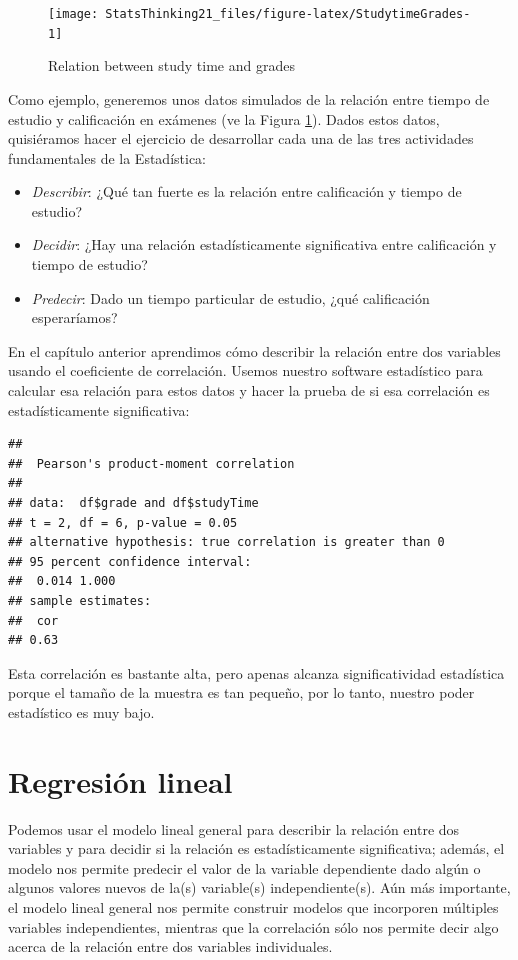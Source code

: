 \documentclass[
  12pt,
]{book}
\providecommand{\tightlist}{%
  \setlength{\itemsep}{0pt}\setlength{\parskip}{0pt}}
\begin{document}
\begin{figure}
\texttt{[image: StatsThinking21\_files/figure-latex/StudytimeGrades-1]} \caption{Relation between study time and grades}\label{fig:StudytimeGrades}
\end{figure}

Como ejemplo, generemos unos datos simulados de la relación entre tiempo de estudio y calificación en exámenes (ve la Figura \ref{fig:StudytimeGrades}). Dados estos datos, quisiéramos hacer el ejercicio de desarrollar cada una de las tres actividades fundamentales de la Estadística:

\begin{itemize}
\tightlist
\item
  \emph{Describir}: ¿Qué tan fuerte es la relación entre calificación y tiempo de estudio?
\item
  \emph{Decidir}: ¿Hay una relación estadísticamente significativa entre calificación y tiempo de estudio?
\item
  \emph{Predecir}: Dado un tiempo particular de estudio, ¿qué calificación esperaríamos?
\end{itemize}

En el capítulo anterior aprendimos cómo describir la relación entre dos variables usando el coeficiente de correlación. Usemos nuestro software estadístico para calcular esa relación para estos datos y hacer la prueba de si esa correlación es estadísticamente significativa:

\begin{verbatim}
## 
## 	Pearson's product-moment correlation
## 
## data:  df$grade and df$studyTime
## t = 2, df = 6, p-value = 0.05
## alternative hypothesis: true correlation is greater than 0
## 95 percent confidence interval:
##  0.014 1.000
## sample estimates:
##  cor 
## 0.63
\end{verbatim}

Esta correlación es bastante alta, pero apenas alcanza significatividad estadística porque el tamaño de la muestra es tan pequeño, por lo tanto, nuestro poder estadístico es muy bajo.

\hypertarget{linear-regression}{%
\section{Regresión lineal}\label{linear-regression}}

Podemos usar el modelo lineal general para describir la relación entre dos variables y para decidir si la relación es estadísticamente significativa; además, el modelo nos permite predecir el valor de la variable dependiente dado algún o algunos valores nuevos de la(s) variable(s) independiente(s). Aún más importante, el modelo lineal general nos permite construir modelos que incorporen múltiples variables independientes, mientras que la correlación sólo nos permite decir algo acerca de la relación entre dos variables individuales.
\end{document}
